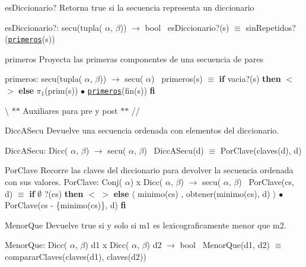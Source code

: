 \begin{DoxyParagraph}{es\+Diccionario?}
Retorna true si la secuencia representa un diccionario

es\+Diccionario?\+: secu(tupla( $\alpha$, $\beta$)) $\to$ bool~\newline
es\+Diccionario?(s) $\equiv$ sin\+Repetidos?(\href{axiomas.html#primeros}{\tt primeros}(s)) 
\end{DoxyParagraph}


\begin{DoxyParagraph}{primeros}
Proyecta las primeras componentes de una secuencia de pares

primeros\+: secu(tupla( $\alpha$, $\beta$)) $\to$ secu( $\alpha$)~\newline
primeros(s) $\equiv$ {\bfseries if} vacia?(s) {\bfseries then} $<$$>$ {\bfseries else} $\pi_1$(prim(s)) $\bullet$ \href{axiomas.html#primeros}{\tt primeros}(fin(s)) {\bfseries fi} 
\end{DoxyParagraph}


\textbackslash{} $\ast$$\ast$ Auxiliares para pre y post $\ast$$\ast$ // \begin{DoxyParagraph}{Dicc\+A\+Secu}
Devuelve una secuencia ordenada con elementos del diccionario.

Dicc\+A\+Secu\+: Dicc( $\alpha$, $\beta$) $\to$ secu( $\alpha$, $\beta$)~\newline
Dicc\+A\+Secu(d) $\equiv$ Por\+Clave(claves(d), d) 
\end{DoxyParagraph}


\begin{DoxyParagraph}{Por\+Clave}
Recorre las claves del diccionario para devolver la secuencia ordenada con sus valores. Por\+Clave\+: Conj( $\alpha$) x Dicc( $\alpha$, $\beta$) $\to$ secu( $\alpha$, $\beta$)~\newline
Por\+Clave(cs, d) $\equiv$ {\bfseries if} $\emptyset$ ?(cs) {\bfseries then} $<$ $>$ {\bfseries else} $\langle$ minimo(cs) , obtener(minimo(cs), d) $\rangle$ $\bullet$ Por\+Clave(cs -\/ \{minimo(cs)\}, d) {\bfseries fi} 
\end{DoxyParagraph}


\begin{DoxyParagraph}{Menor\+Que}
Devuelve true si y solo si m1 es lexicograficamente menor que m2.

Menor\+Que\+: Dicc( $\alpha$, $\beta$) d1 x Dicc( $\alpha$, $\beta$) d2 $\to$ bool~\newline
Menor\+Que(d1, d2) $\equiv$ comparar\+Claves(claves(d1), claves(d2)) 
\end{DoxyParagraph}


